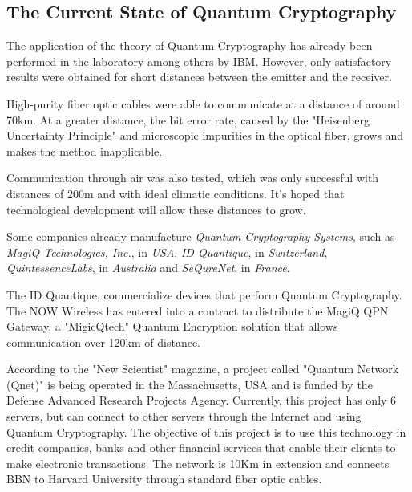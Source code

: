\documentclass[conference]{IEEEtran}
\begin{document}
\vspace{6pt}

\subsection{The Current State of Quantum Cryptography}

The application of the theory of Quantum Cryptography has already been performed in the laboratory among others by IBM. However, only satisfactory results were obtained for short distances between the emitter and the receiver.

\vspace{4pt}

High-purity fiber optic cables were able to communicate at a distance of around 70km. At a greater distance, the bit error rate, caused by the "Heisenberg Uncertainty Principle" and microscopic impurities in the optical fiber, grows and makes the method inapplicable.

\vspace{4pt}

Communication through air was also tested, which was only successful with distances of 200m and with ideal climatic conditions. It's hoped that technological development will allow these distances to grow.

\vspace{4pt}

Some companies already manufacture \textit{Quantum Cryptography Systems}, such as \textit{MagiQ Technologies, Inc.}, in \textit{USA}, \textit{ID Quantique}, in \textit{Switzerland}, \textit{QuintessenceLabs}, in \textit{Australia} and \textit{SeQureNet}, in \textit{France}.

\vspace{4pt}

The ID Quantique, commercialize devices that perform Quantum Cryptography. The NOW Wireless has entered into a contract to distribute the MagiQ QPN Gateway, a "MigicQtech" Quantum Encryption solution that allows communication over 120km of distance.

\vspace{4pt}

According to the "New Scientist" magazine, a project called "Quantum Network (Qnet)" is being operated in the Massachusetts, USA and is funded by the Defense Advanced Research Projects Agency. Currently, this project has only 6 servers, but can connect to other servers through the Internet and using Quantum Cryptography. The objective of this project is to use this technology in credit companies, banks and other financial services that enable their clients to make electronic transactions. The network is 10Km in extension and connects BBN to Harvard University through standard fiber optic cables.
\end{document}
